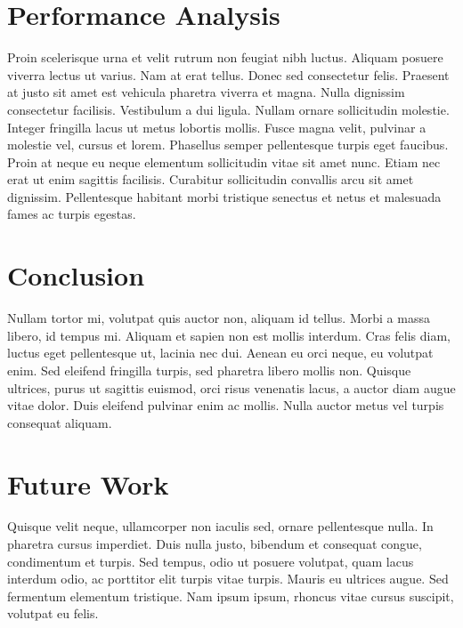 \documentclass[10pt]{article}
\begin{document}
\begin{multicols}{2}
		
		
		\section*{Performance Analysis}
		Proin scelerisque urna et velit rutrum non feugiat nibh luctus. Aliquam posuere viverra lectus ut varius. Nam at erat tellus. Donec sed consectetur felis. Praesent at justo sit amet est vehicula pharetra viverra et magna. Nulla dignissim consectetur facilisis. Vestibulum a dui ligula. Nullam ornare sollicitudin molestie. Integer fringilla lacus ut metus lobortis mollis. Fusce magna velit, pulvinar a molestie vel, cursus et lorem. Phasellus semper pellentesque turpis eget faucibus. Proin at neque eu neque elementum sollicitudin vitae sit amet nunc. Etiam nec erat ut enim sagittis facilisis. Curabitur sollicitudin convallis arcu sit amet dignissim. Pellentesque habitant morbi tristique senectus et netus et malesuada fames ac turpis egestas.
		
		
		\section*{Conclusion}
		Nullam tortor mi, volutpat quis auctor non, aliquam id tellus. Morbi a massa libero, id tempus mi. Aliquam et sapien non est mollis interdum. Cras felis diam, luctus eget pellentesque ut, lacinia nec dui. Aenean eu orci neque, eu volutpat enim. Sed eleifend fringilla turpis, sed pharetra libero mollis non. Quisque ultrices, purus ut sagittis euismod, orci risus venenatis lacus, a auctor diam augue vitae dolor. Duis eleifend pulvinar enim ac mollis. Nulla auctor metus vel turpis consequat aliquam.
		
		\section*{Future Work}
		Quisque velit neque, ullamcorper non iaculis sed, ornare pellentesque nulla. In pharetra cursus imperdiet. Duis nulla justo, bibendum et consequat congue, condimentum et turpis. Sed tempus, odio ut posuere volutpat, quam lacus interdum odio, ac porttitor elit turpis vitae turpis. Mauris eu ultrices augue. Sed fermentum elementum tristique. Nam ipsum ipsum, rhoncus vitae cursus suscipit, volutpat eu felis.

	\end{multicols}
\end{document}
